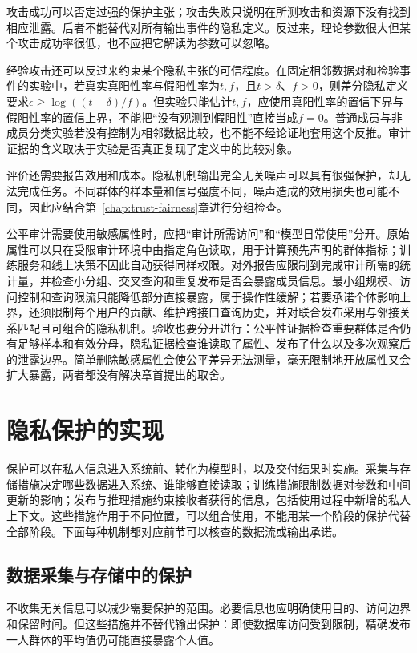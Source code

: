 攻击成功可以否定过强的保护主张；攻击失败只说明在所测攻击和资源下没有找到相应泄露。后者不能替代对所有输出事件的隐私定义。反过来，理论参数很大但某个攻击成功率很低，也不应把它解读为参数可以忽略。

经验攻击还可以反过来约束某个隐私主张的可信程度。在固定相邻数据对和检验事件的实验中，若真实真阳性率与假阳性率为$t,f$，且$t>\delta$、$f>0$，则差分隐私定义要求$\epsilon\geq\log((t-\delta)/f)$。但实验只能估计$t,f$，应使用真阳性率的置信下界与假阳性率的置信上界，不能把“没有观测到假阳性”直接当成$f=0$。普通成员与非成员分类实验若没有控制为相邻数据比较，也不能不经论证地套用这个反推。审计证据的含义取决于实验是否真正复现了定义中的比较对象。

评价还需要报告效用和成本。隐私机制输出完全无关噪声可以具有很强保护，却无法完成任务。不同群体的样本量和信号强度不同，噪声造成的效用损失也可能不同，因此应结合第~\ref{chap:trust-fairness}章进行分组检查。

公平审计需要使用敏感属性时，应把“审计所需访问”和“模型日常使用”分开。原始属性可以只在受限审计环境中由指定角色读取，用于计算预先声明的群体指标；训练服务和线上决策不因此自动获得同样权限。对外报告应限制到完成审计所需的统计量，并检查小分组、交叉查询和重复发布是否会暴露成员信息。最小组规模、访问控制和查询限流只能降低部分直接暴露，属于操作性缓解；若要承诺个体影响上界，还须限制每个用户的贡献、维护跨接口查询历史，并对联合发布采用与邻接关系匹配且可组合的隐私机制。验收也要分开进行：公平性证据检查重要群体是否仍有足够样本和有效分母，隐私证据检查谁读取了属性、发布了什么以及多次观察后的泄露边界。简单删除敏感属性会使公平差异无法测量，毫无限制地开放属性又会扩大暴露，两者都没有解决章首提出的取舍。

\section{隐私保护的实现}
\label{sec:privacy-use}

保护可以在私人信息进入系统前、转化为模型时，以及交付结果时实施。采集与存储措施决定哪些数据进入系统、谁能够直接读取；训练措施限制数据对参数和中间更新的影响；发布与推理措施约束接收者获得的信息，包括使用过程中新增的私人上下文。这些措施作用于不同位置，可以组合使用，不能用某一个阶段的保护代替全部阶段。下面每种机制都对应前节可以核查的数据流或输出承诺。

\subsection{数据采集与存储中的保护}
\label{sec:privacy-collection}

不收集无关信息可以减少需要保护的范围。必要信息也应明确使用目的、访问边界和保留时间。但这些措施并不替代输出保护：即使数据库访问受到限制，精确发布一人群体的平均值仍可能直接暴露个人值。

